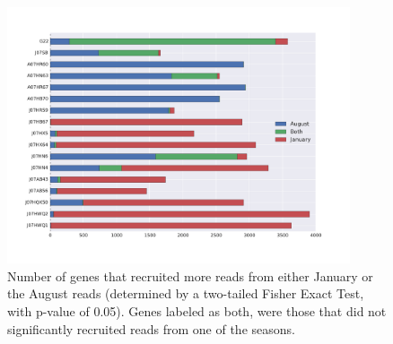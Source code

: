 %
%
%


\begin{figure}[!hbtp]
  \centering
  \includegraphics[width=0.9\textwidth]{Chapter5/Figures/GeneDifferencesSeason.pdf}
  \caption{Number of genes that recruited more reads from either January or the August reads (determined by a two-tailed Fisher Exact Test, with p-value of 0.05). Genes labeled as both, were those that did not significantly recruited reads from one of the seasons.}
  \label{CoverageGenes}
\end{figure}


